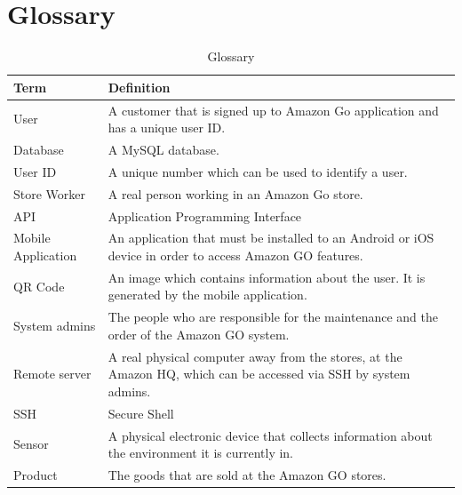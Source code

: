 \documentclass[11pt]{article}
\begin{document}
\section{Glossary}
\begin{table}[H]
    \begin{center}
    \begin{tabular}{|p{5cm}|p{8cm}|}
    \hline
    \textbf{Term} & \textbf{Definition}   \\ \hline
    User & A customer that is signed up to Amazon Go application and has a unique user ID. \\ \hline
    
    Database & A MySQL database.  \\ \hline
    User ID & A unique number which can be used to identify a user.  \\ \hline
    Store Worker & A real person working in an Amazon Go store.  \\ \hline
    API & Application Programming Interface   \\ \hline
    Mobile Application & An application that must be installed to an Android or iOS device in order to access Amazon GO features.\\ \hline
    QR Code & An image which contains information about the user. It is generated by the mobile application.  \\ \hline
    System admins  & The people who are responsible for the maintenance and the order of the Amazon GO system.   \\ \hline
    Remote server & A real physical computer away from the stores, at the Amazon HQ, which can be accessed via SSH by system admins.   \\ \hline
    SSH & Secure Shell   \\ \hline
    Sensor & A physical electronic device that collects information about the environment it is currently in.   \\ \hline
    Product & The goods that are sold at the Amazon GO stores.   \\ \hline

    \end{tabular}
    \caption{Glossary}
    \label{glossary}
      \end{center}
\end{table}
\end{document}
